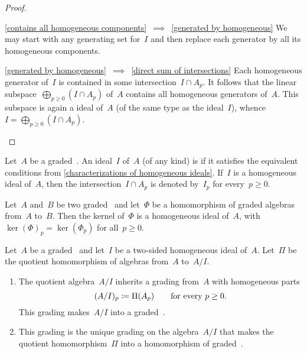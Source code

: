 \begin{proof}
\begin{enumerate}
\begin{implicationlist}
				\item[\ref*{contains all homogeneous components}~$\implies$~\ref*{generated by homogeneous}]
					We may start with any generating set for~$I$ and then replace each generator by all its homogeneous components.
				\item[\ref*{generated by homogeneous}~$\implies$~\ref*{direct sum of intersections}]
					Each homogeneous generator of~$I$ is contained in some intersection~$I \cap A_p$.
					It follows that the linear subspace~$\bigoplus_{p \geq 0} {} (I \cap A_p)$ of~$A$ contains all homogeneous generators of~$A$.
					This subspace is again a ideal of~$A$ (of the same type as the ideal~$I$), whence~$I = \bigoplus_{p \geq 0} {} (I \cap A_p)$.
				\qedhere
			\end{implicationlist}
	\end{enumerate}
\end{proof}


\begin{definition}
	Let~$A$ be a graded~\algebra{$\kf$}.
	An ideal~$I$ of~$A$ (of any kind) is  if it satisfies the equivalent conditions from \cref{characterizations of homogeneous ideals}.
	If~$I$ is a homogeneous ideal of~$A$, then the intersection~$I \cap A_p$ is denoted by~$I_p$ for every~$p \geq 0$.
\end{definition}


\begin{example}
	Let~$A$ and~$B$ be two graded~\algebras{$\kf$} and let~$\Phi$ be a homomorphism of graded algebras from~$A$ to~$B$.
	Then the kernel of~$\Phi$ is a homogeneous ideal of~$A$, with~$\ker(\Phi)_p = \ker( \Phi_p )$ for all~$p \geq 0$.
\end{example}


\begin{proposition}
	Let~$A$ be a graded~\algebra{$\kf$} and let~$I$ be a two-sided homogeneous ideal of~$A$.
	Let~$\Pi$ be the quotient homomorphism of algebras from~$A$ to~$A/I$.
	\begin{enumerate}
		\item
			The quotient algebra~$A/I$ inherits a grading from~$A$ with homogeneous parts
			\[
				(A/I)_p \coloneqq \Pi(A_p)
				\qquad
				\text{for every~$p \geq 0$.}
			\]
			This grading makes~$A/I$ into a graded~\algebra{$\kf$}.
		\item
			This grading is the unique grading on the algebra~$A/I$ that makes the quotient homomorphism~$\Pi$ into a homomorphism of graded~\algebras{$\kf$}.
	\end{enumerate}
\end{proposition}


